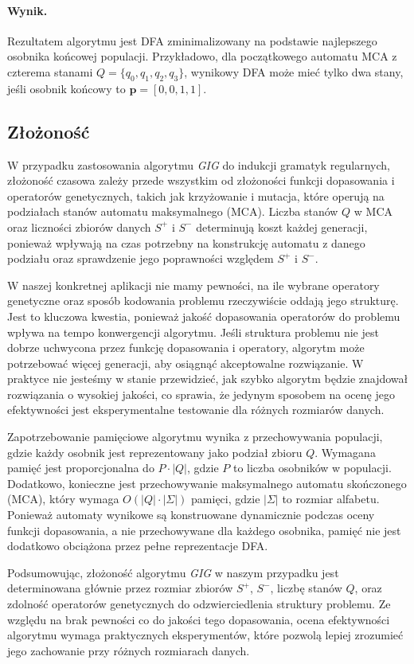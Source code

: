 \paragraph*{Wynik.}  
Rezultatem algorytmu jest DFA zminimalizowany na podstawie najlepszego osobnika końcowej populacji. Przykładowo, dla początkowego automatu MCA z czterema stanami \( Q = \{q_0, q_1, q_2, q_3\} \), wynikowy DFA może mieć tylko dwa stany, jeśli osobnik końcowy to \( \mathbf{p} = [0, 0, 1, 1] \).

\subsection{Złożoność}

W przypadku zastosowania algorytmu \textit{GIG} do indukcji gramatyk regularnych, złożoność czasowa zależy przede wszystkim od złożoności funkcji dopasowania i operatorów genetycznych, takich jak krzyżowanie i mutacja, które operują na podziałach stanów automatu maksymalnego (MCA). Liczba stanów \( Q \) w MCA oraz liczności zbiorów danych \( S^+ \) i \( S^- \) determinują koszt każdej generacji, ponieważ wpływają na czas potrzebny na konstrukcję automatu z danego podziału oraz sprawdzenie jego poprawności względem \( S^+ \) i \( S^- \).

W naszej konkretnej aplikacji nie mamy pewności, na ile wybrane operatory genetyczne oraz sposób kodowania problemu rzeczywiście oddają jego strukturę. Jest to kluczowa kwestia, ponieważ jakość dopasowania operatorów do problemu wpływa na tempo konwergencji algorytmu. Jeśli struktura problemu nie jest dobrze uchwycona przez funkcję dopasowania i operatory, algorytm może potrzebować więcej generacji, aby osiągnąć akceptowalne rozwiązanie. W praktyce nie jesteśmy w stanie przewidzieć, jak szybko algorytm będzie znajdował rozwiązania o wysokiej jakości, co sprawia, że jedynym sposobem na ocenę jego efektywności jest eksperymentalne testowanie dla różnych rozmiarów danych.

Zapotrzebowanie pamięciowe algorytmu wynika z przechowywania populacji, gdzie każdy osobnik jest reprezentowany jako podział zbioru \( Q \). Wymagana pamięć jest proporcjonalna do \( P \cdot |Q| \), gdzie \( P \) to liczba osobników w populacji. Dodatkowo, konieczne jest przechowywanie maksymalnego automatu skończonego (MCA), który wymaga \( O(|Q| \cdot |\Sigma|) \) pamięci, gdzie \( |\Sigma| \) to rozmiar alfabetu. Ponieważ automaty wynikowe są konstruowane dynamicznie podczas oceny funkcji dopasowania, a nie przechowywane dla każdego osobnika, pamięć nie jest dodatkowo obciążona przez pełne reprezentacje DFA.

Podsumowując, złożoność algorytmu \textit{GIG} w naszym przypadku jest determinowana głównie przez rozmiar zbiorów \( S^+ \), \( S^- \), liczbę stanów \( Q \), oraz zdolność operatorów genetycznych do odzwierciedlenia struktury problemu. Ze względu na brak pewności co do jakości tego dopasowania, ocena efektywności algorytmu wymaga praktycznych eksperymentów, które pozwolą lepiej zrozumieć jego zachowanie przy różnych rozmiarach danych.
